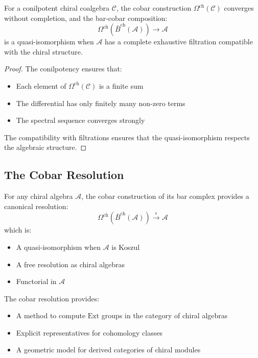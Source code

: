\begin{theorem}\label{thm:cobar-convergence}
For a conilpotent chiral coalgebra $\mathcal{C}$, the cobar construction $\Omega^{\text{ch}}(\mathcal{C})$ converges without completion, and the bar-cobar composition:
\[
\Omega^{\text{ch}}(\bar{B}^{\text{ch}}(\mathcal{A})) \to \mathcal{A}
\]
is a quasi-isomorphism when $\mathcal{A}$ has a complete exhaustive filtration compatible with the chiral structure.
\end{theorem}

\begin{proof}
The conilpotency ensures that:
\begin{itemize}
\item Each element of $\Omega^{\text{ch}}(\mathcal{C})$ is a finite sum
\item The differential has only finitely many non-zero terms
\item The spectral sequence converges strongly
\end{itemize}
The compatibility with filtrations ensures that the quasi-isomorphism respects the algebraic structure.
\end{proof}

\subsection{The Cobar Resolution}

\begin{theorem}\label{thm:cobar-resolution}
For any chiral algebra $\mathcal{A}$, the cobar construction of its bar complex provides a canonical resolution:
\[
\Omega^{\text{ch}}(\bar{B}^{\text{ch}}(\mathcal{A})) \xrightarrow{\epsilon} \mathcal{A}
\]
which is:
\begin{itemize}
\item A quasi-isomorphism when $\mathcal{A}$ is Koszul
\item A free resolution as chiral algebras
\item Functorial in $\mathcal{A}$
\end{itemize}
\end{theorem}

\begin{remark}
The cobar resolution provides:
\begin{itemize}
\item A method to compute $\text{Ext}$ groups in the category of chiral algebras
\item Explicit representatives for cohomology classes
\item A geometric model for derived categories of chiral modules
\end{itemize}
\end{remark}

